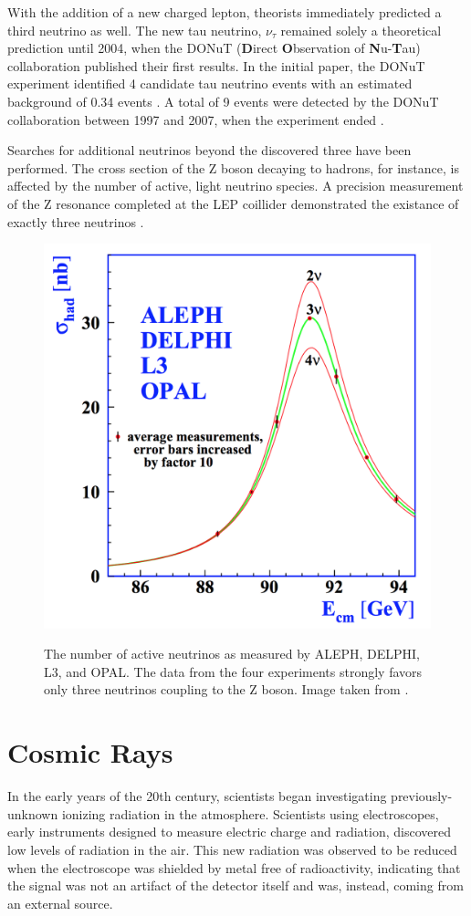 With the addition of a new charged lepton, theorists immediately predicted a third neutrino as well.
The new tau neutrino, $\nu_\tau$ remained solely a theoretical prediction until 2004, when the DONuT (\textbf{D}irect \textbf{O}bservation of \textbf{N}u-\textbf{T}au) collaboration published their first results.
In the initial paper, the DONuT experiment identified 4 candidate tau neutrino events with an estimated background of 0.34 events \cite{DONUT-2001}.
A total of 9 events were detected by the DONuT collaboration between 1997 and 2007, when the experiment ended \cite{DONUT-2007}.

Searches for additional neutrinos beyond the discovered three have been performed.
The cross section of the Z boson decaying to hadrons, for instance, is affected by the number of active, light neutrino species.
A precision measurement of the Z resonance completed at the LEP coillider demonstrated the existance of exactly three neutrinos \cite{ALEPH-3Nu}.

\begin{figure}
\centering
\includegraphics[width=0.5\linewidth]{ALEPH_NumNu.png} 
\label{fig:ALEPH}
\caption{The number of active neutrinos as measured by ALEPH, DELPHI, L3, and OPAL. The data from the four experiments strongly favors only three neutrinos coupling to the Z boson. Image taken from \cite{ALEPH-3Nu}.}
\end{figure}

\label{sec:cosmic_rays}
\section{Cosmic Rays}
In the early years of the 20th century, scientists began investigating previously-unknown ionizing radiation in the atmosphere.
Scientists using electroscopes, early instruments designed to measure electric charge and radiation, discovered low levels of radiation in the air.
This new radiation was observed to be reduced when the electroscope was shielded by metal free of radioactivity, indicating that the signal was not an artifact of the detector itself and was, instead, coming from an external source.

